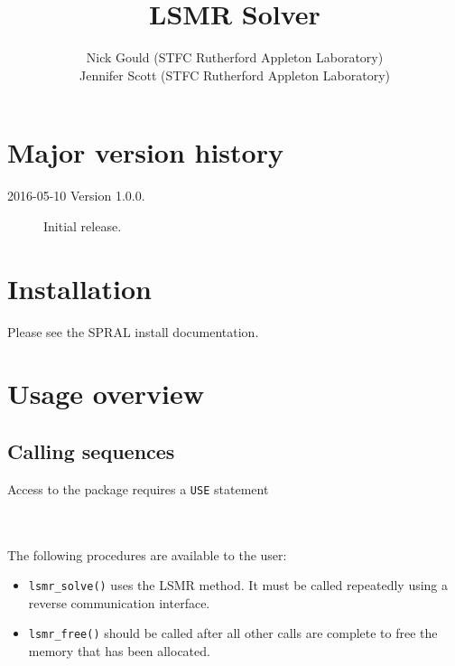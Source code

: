 \title{LSMR Solver}
\author{
   Nick Gould (STFC Rutherford Appleton Laboratory) \\
   Jennifer Scott (STFC Rutherford Appleton Laboratory)
}
\spralmaketitle
\thispagestyle{firststyle}

\newpage
\section*{Major version history}
\begin{description}
\item[2016-05-10 Version 1.0.0.] Initial release.
\end{description}


\section{Installation}
Please see the SPRAL install documentation. 


\section{Usage overview}

\subsection{Calling sequences}

Access to the package requires a {\tt USE} statement \\ \\
\indent\hspace{8mm}{\tt use spral\_lsmr} \\

\medskip

\noindent
The following procedures are available to the user:
\begin{itemize}
\item {\tt lsmr\_solve()} uses the LSMR method. It must be called repeatedly
using a reverse communication interface.
\item {\tt lsmr\_free()} should be called after all other calls are complete
to free the memory that has been allocated. 
\end{itemize}



